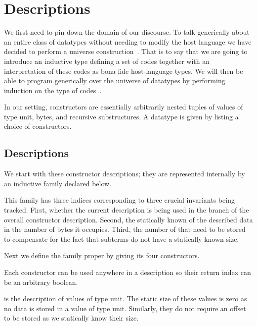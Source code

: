 \section{Descriptions}\label{sec:desc}

We first need to pin down the domain of our discourse.
%
To talk generically about an entire class of datatypes
without needing to modify the host language
we have decided to perform a universe
construction~\cite{benke-ugpp, DBLP:phd/ethos/Morris07, DBLP:conf/icfp/LohM11}.
%
That is to say that we are going to introduce an inductive type
defining a set of codes together
with an interpretation of these codes as bona fide
host-language types.
%
We will then be able to program generically over the universe of
datatypes by performing induction on the type of
codes~\cite{DBLP:conf/tphol/PfeiferR99}.

In our setting, constructors are essentially arbitrarily nested tuples of
values of type unit,
bytes,
and recursive substructures.
%
A datatype is given by listing a choice of constructors.

\subsection{Descriptions}

We start with these constructor descriptions;
they are represented internally by an inductive family 
declared below.


This family has three indices corresponding to three crucial
invariants being tracked.
%
First, whether the current description is being used in the
 branch of the overall constructor description.
%
Second, the statically known  of the described data
in the number of bytes it occupies.
%
Third, the number of  that need to be stored to
compensate for the fact that subterms do not have a statically known
size.

Next we define the family proper by giving its four constructors.


Each constructor can be used anywhere in a description so their return
 index can be an arbitrary boolean.

 is the description of values of type unit. The static
size of these values is zero as no data is stored in a value of type unit.
Similarly, they do not require an offset to be stored as we statically
know their size.


